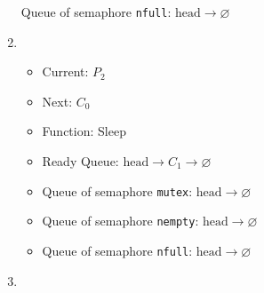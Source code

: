 \documentclass[11pt]{article}
\begin{document}
\begin{question}
\begin{enumerate}
{\begin{itemize}
{                            Queue of semaphore {\tt nfull}: $\text{head}\longrightarrow
                            \varnothing$
                        }
                \end{itemize}}
                \item {
                    \begin{itemize}
                        \item{Current: $P_{2}$}
                        \item{Next: $C_{0}$}
                        \item{Function: Sleep}
                        \item{
                            Ready Queue: $\text{head}\longrightarrow
                            C_{1}\longrightarrow
                            \varnothing$
                        } \item{
                            Queue of semaphore {\tt mutex}: $\text{head}\longrightarrow
                            \varnothing$
                        }
                        \item{
                            Queue of semaphore {\tt nempty}: $\text{head}\longrightarrow
                            \varnothing$
                        }
                        \item{
                            Queue of semaphore {\tt nfull}: $\text{head}\longrightarrow
                            \varnothing$
                        }
                \end{itemize}}
                \item {
                    }
\end{enumerate}
\end{question}
\end{document}

